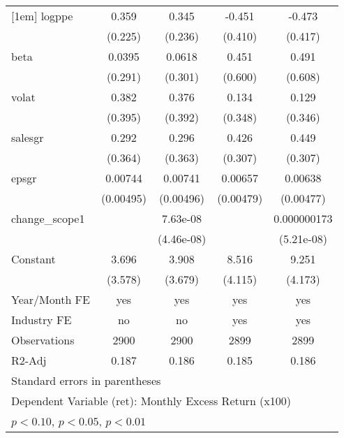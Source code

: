 \begin{table}[htbp]
\begin{tabular}{l*{4}{c}}
[1em]
logppe              &       0.359         &       0.345         &      -0.451         &      -0.473         \\
                    &     (0.225)         &     (0.236)         &     (0.410)         &     (0.417)         \\
[1em]
beta                &      0.0395         &      0.0618         &       0.451         &       0.491         \\
                    &     (0.291)         &     (0.301)         &     (0.600)         &     (0.608)         \\
[1em]
volat               &       0.382         &       0.376         &       0.134         &       0.129         \\
                    &     (0.395)         &     (0.392)         &     (0.348)         &     (0.346)         \\
[1em]
salesgr             &       0.292         &       0.296         &       0.426         &       0.449         \\
                    &     (0.364)         &     (0.363)         &     (0.307)         &     (0.307)         \\
[1em]
epsgr               &     0.00744         &     0.00741         &     0.00657         &     0.00638         \\
                    &   (0.00495)         &   (0.00496)         &   (0.00479)         &   (0.00477)         \\
[1em]
change\_scope1       &                     &    7.63e-08\sym{*}  &                     & 0.000000173\sym{***}\\
                    &                     &  (4.46e-08)         &                     &  (5.21e-08)         \\
[1em]
Constant            &       3.696         &       3.908         &       8.516\sym{**} &       9.251\sym{**} \\
                    &     (3.578)         &     (3.679)         &     (4.115)         &     (4.173)         \\
\hline
Year/Month FE       &         yes         &         yes         &         yes         &         yes         \\
Industry FE         &          no         &          no         &         yes         &         yes         \\
Observations        &        2900         &        2900         &        2899         &        2899         \\
R2-Adj              &       0.187         &       0.186         &       0.185         &       0.186         \\
\hline\hline
\multicolumn{5}{l}{\footnotesize Standard errors in parentheses}\\
\multicolumn{5}{l}{\footnotesize Dependent Variable (ret): Monthly Excess Return (x100)}\\
\multicolumn{5}{l}{\footnotesize \sym{*} \(p<0.10\), \sym{**} \(p<0.05\), \sym{***} \(p<0.01\)}\\
\end{tabular}
\end{table}
